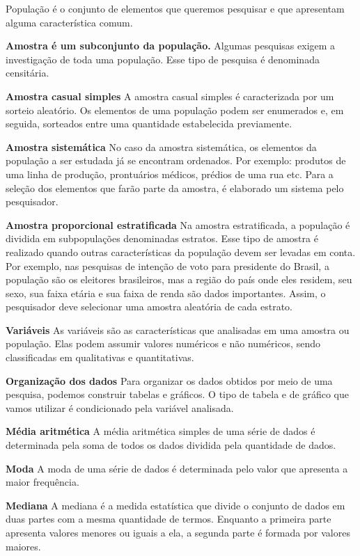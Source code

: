 {{{População é o conjunto de elementos que queremos pesquisar e que
apresentam alguma característica comum.

\smallskip\noindent\textbf{Amostra é um subconjunto da população.}
\quad
Algumas pesquisas exigem a investigação de toda uma população. Esse tipo
de pesquisa é denominada censitária.

\smallskip\noindent\textbf{Amostra casual simples}
\quad
A amostra casual simples é caracterizada por um sorteio aleatório. Os
elementos de uma população podem ser enumerados e, em seguida, sorteados
entre uma quantidade estabelecida previamente.

\smallskip\noindent\textbf{Amostra sistemática}
\quad
No caso da amostra sistemática, os elementos da população a ser estudada
já se encontram ordenados. Por exemplo: produtos de uma linha de
produção, prontuários médicos, prédios de uma rua etc. Para a seleção
dos elementos que farão parte da amostra, é elaborado um sistema pelo
pesquisador.

\smallskip\noindent\textbf{Amostra proporcional estratificada}
\quad
Na amostra estratificada, a população é dividida em subpopulações
denominadas estratos. Esse tipo de amostra é realizado quando outras
características da população devem ser levadas em conta. Por exemplo,
nas pesquisas de intenção de voto para presidente do Brasil, a população
são os eleitores brasileiros, mas a região do país onde eles residem,
seu sexo, sua faixa etária e sua faixa de renda são dados importantes.
Assim, o pesquisador deve selecionar uma amostra aleatória de cada
estrato.

\smallskip\noindent\textbf{Variáveis}
\quad
As variáveis são as características que analisadas em uma amostra ou
população. Elas podem assumir valores numéricos e não numéricos, sendo
classificadas em qualitativas e quantitativas.

\smallskip\noindent\textbf{Organização dos dados}
\quad
Para organizar os dados obtidos por meio de uma pesquisa, podemos
construir tabelas e gráficos. O tipo de tabela e de gráfico que vamos
utilizar é condicionado pela variável analisada.

\smallskip\noindent\textbf{Média aritmética}
\quad
A média aritmética simples de uma série de dados é determinada pela soma
de todos os dados dividida pela quantidade de dados.

\smallskip\noindent\textbf{Moda}
\quad
A moda de uma série de dados é determinada pelo valor que apresenta a
maior frequência.

\smallskip\noindent\textbf{Mediana}
\quad
A mediana é a medida estatística que divide o conjunto de dados em duas
partes com a mesma quantidade de termos. Enquanto a primeira parte
apresenta valores menores ou iguais a ela, a segunda parte é formada por
valores maiores.}

}}
